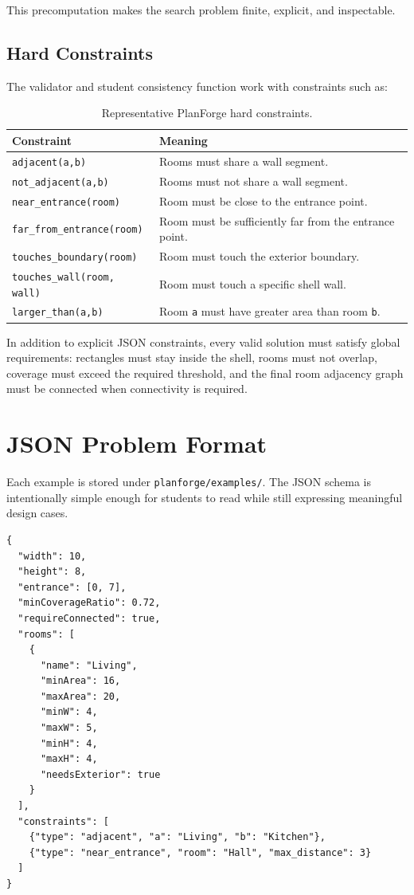 \documentclass[11pt]{article}
\begin{document}
This precomputation makes the search problem finite, explicit, and inspectable.

\subsection{Hard Constraints}

The validator and student consistency function work with constraints such as:

\begin{table}[H]
\centering
\begin{tabular}{ll}
\toprule
Constraint & Meaning \\
\midrule
\texttt{adjacent(a,b)} & Rooms must share a wall segment. \\
\texttt{not\_adjacent(a,b)} & Rooms must not share a wall segment. \\
\texttt{near\_entrance(room)} & Room must be close to the entrance point. \\
\texttt{far\_from\_entrance(room)} & Room must be sufficiently far from the entrance point. \\
\texttt{touches\_boundary(room)} & Room must touch the exterior boundary. \\
\texttt{touches\_wall(room, wall)} & Room must touch a specific shell wall. \\
\texttt{larger\_than(a,b)} & Room \texttt{a} must have greater area than room \texttt{b}. \\
\bottomrule
\end{tabular}
\caption{Representative PlanForge hard constraints.}
\end{table}

In addition to explicit JSON constraints, every valid solution must satisfy global requirements:
rectangles must stay inside the shell, rooms must not overlap, coverage must exceed the required
threshold, and the final room adjacency graph must be connected when connectivity is required.

\section{JSON Problem Format}

Each example is stored under \texttt{planforge/examples/}. The JSON schema is intentionally
simple enough for students to read while still expressing meaningful design cases.

\begin{lstlisting}[caption={Simplified example of a PlanForge problem.}]
{
  "width": 10,
  "height": 8,
  "entrance": [0, 7],
  "minCoverageRatio": 0.72,
  "requireConnected": true,
  "rooms": [
    {
      "name": "Living",
      "minArea": 16,
      "maxArea": 20,
      "minW": 4,
      "maxW": 5,
      "minH": 4,
      "maxH": 4,
      "needsExterior": true
    }
  ],
  "constraints": [
    {"type": "adjacent", "a": "Living", "b": "Kitchen"},
    {"type": "near_entrance", "room": "Hall", "max_distance": 3}
  ]
}
\end{lstlisting}
\end{document}
